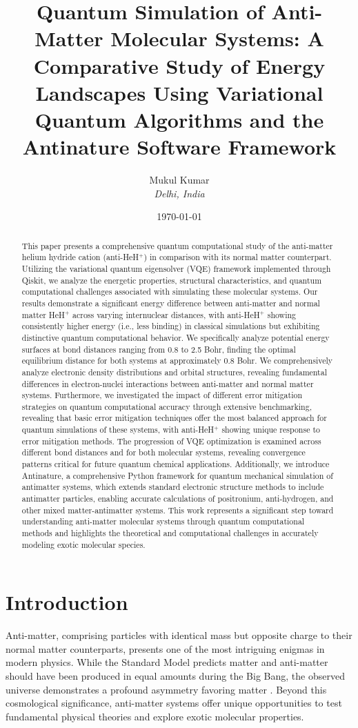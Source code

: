 \documentclass[10pt,twocolumn,a4paper]{article}
\title{\textbf{Quantum Simulation of Anti-Matter Molecular Systems: A Comparative Study of Energy Landscapes Using Variational Quantum Algorithms and the Antinature Software Framework}}
\author{Mukul Kumar\\
\textit{Delhi, India}
}
\date{\today}
\begin{document}
\maketitle

\begin{abstract}
This paper presents a comprehensive quantum computational study of the anti-matter helium hydride cation (anti-HeH$^+$) in comparison with its normal matter counterpart. Utilizing the variational quantum eigensolver (VQE) framework implemented through Qiskit, we analyze the energetic properties, structural characteristics, and quantum computational challenges associated with simulating these molecular systems. Our results demonstrate a significant energy difference between anti-matter and normal matter HeH$^+$ across varying internuclear distances, with anti-HeH$^+$ showing consistently higher energy (i.e., less binding) in classical simulations but exhibiting distinctive quantum computational behavior. We specifically analyze potential energy surfaces at bond distances ranging from 0.8 to 2.5 Bohr, finding the optimal equilibrium distance for both systems at approximately 0.8 Bohr. We comprehensively analyze electronic density distributions and orbital structures, revealing fundamental differences in electron-nuclei interactions between anti-matter and normal matter systems. Furthermore, we investigated the impact of different error mitigation strategies on quantum computational accuracy through extensive benchmarking, revealing that basic error mitigation techniques offer the most balanced approach for quantum simulations of these systems, with anti-HeH$^+$ showing unique response to error mitigation methods. The progression of VQE optimization is examined across different bond distances and for both molecular systems, revealing convergence patterns critical for future quantum chemical applications. Additionally, we introduce Antinature, a comprehensive Python framework for quantum mechanical simulation of antimatter systems, which extends standard electronic structure methods to include antimatter particles, enabling accurate calculations of positronium, anti-hydrogen, and other mixed matter-antimatter systems. This work represents a significant step toward understanding anti-matter molecular systems through quantum computational methods and highlights the theoretical and computational challenges in accurately modeling exotic molecular species.
\end{abstract}

\section{Introduction}
Anti-matter, comprising particles with identical mass but opposite charge to their normal matter counterparts, presents one of the most intriguing enigmas in modern physics. While the Standard Model predicts matter and anti-matter should have been produced in equal amounts during the Big Bang, the observed universe demonstrates a profound asymmetry favoring matter \cite{baker2021matter}. Beyond this cosmological significance, anti-matter systems offer unique opportunities to test fundamental physical theories and explore exotic molecular properties.
\end{document}
